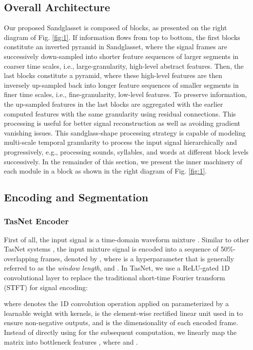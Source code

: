 \documentclass{article}
\begin{document}
\subsection{Overall Architecture}
Our proposed Sandglasset is composed of  blocks, as presented on the right diagram of Fig. \ref{fig:1}. If information flows from top to bottom, the first  blocks constitute an inverted pyramid in Sandglasset, where the signal frames are successively down-sampled into shorter feature sequences of larger segments in coarser time scales, i.e., large-granularity, high-level abstract features. Then, the last  blocks constitute a pyramid, where these high-level features are then inversely up-sampled back into longer feature sequences of smaller segments in finer time scales, i.e., fine-granularity, low-level features. To preserve information, the up-sampled features in the last  blocks are aggregated with the earlier computed features with the same granularity using residual connections. This processing is useful for better signal reconstruction as well as avoiding gradient vanishing issues. This sandglass-shape processing strategy is capable of modeling multi-scale temporal granularity to process the input signal hierarchically and progressively, e.g., processing sounds, syllables, and words at different block levels successively. In the remainder of this section, we present the inner machinery of each module in a block as shown in the right diagram of Fig. \ref{fig:1}.

\subsection{Encoding and Segmentation}
\subsubsection{TasNet Encoder}
First of all, the input signal is a time-domain waveform mixture . Similar to other TasNet systems \cite{luo2018tasnet, luo2019conv, luo2019dual}, the input mixture signal is encoded into a sequence of 50\%-overlapping frames, denoted by , where  is a hyperparameter that is generally referred to as the \textit{window length}, and . In TasNet, we use a ReLU-gated 1D convolutional layer to replace the traditional short-time Fourier transform (STFT) for signal encoding:

where  denotes the 1D convolution operation applied on  parameterized by a learnable weight  with  kernels,  is the element-wise rectified linear unit used in \cite{luo2019dual, chen2020dual} to ensure non-negative outputs, and  is the dimensionality of each encoded frame. Instead of directly using  for the subsequent computation, we linearly map the matrix into bottleneck features , where  and .
\end{document}
